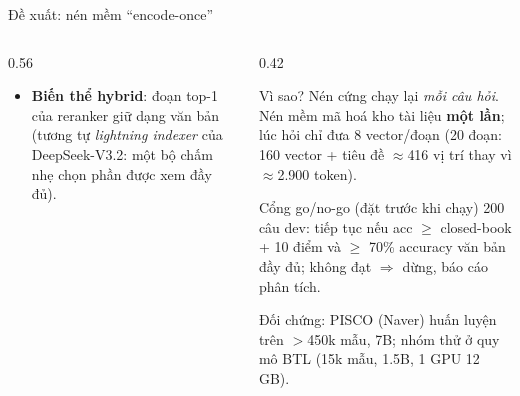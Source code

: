 \documentclass[aspectratio=169,11pt]{beamer}
\begin{document}
\begin{frame}{Đề xuất: nén mềm ``encode-once''}
\begin{columns}[T]
\begin{column}{0.56\textwidth}
{\begin{itemize}
          $k\in\{5,10,20\}$.
        \item \textbf{Biến thể hybrid}: đoạn top-1 của reranker giữ dạng văn bản
          (tương tự \emph{lightning indexer} của DeepSeek-V3.2: một bộ chấm nhẹ chọn phần
          được xem đầy đủ).
      \end{itemize}}
    \end{column}
    \begin{column}{0.42\textwidth}
      \begin{block}{\small Vì sao?}
        \scriptsize Nén cứng chạy lại \emph{mỗi câu hỏi}. Nén mềm mã hoá kho tài liệu
        \textbf{một lần}; lúc hỏi chỉ đưa 8 vector/đoạn (20 đoạn: 160 vector + tiêu đề
        $\approx$416 vị trí thay vì $\approx$2.900 token).
      \end{block}
      \vspace{0.3em}
      \begin{block}{\small Cổng go/no-go (đặt trước khi chạy)}
        \scriptsize 200 câu dev: tiếp tục nếu acc $\ge$ closed-book + 10 điểm và
        $\ge$ 70\% accuracy văn bản đầy đủ; không đạt $\Rightarrow$ dừng, báo cáo phân tích.
      \end{block}
      \vspace{0.3em}
      {\scriptsize\color{hustdark} Đối chứng: PISCO (Naver) huấn luyện trên $>$450k mẫu, 7B;
      nhóm thử ở quy mô BTL (15k mẫu, 1.5B, 1 GPU 12 GB).\par}
    \end{column}
  \end{columns}
\end{frame}
\end{document}
